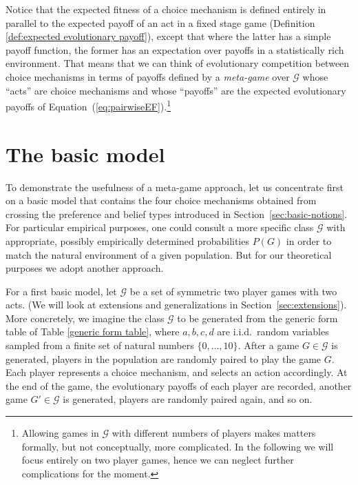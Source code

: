 \documentclass[fleqn,reqno,11pt]{article}
\begin{document}
Notice that the expected fitness of a choice mechanism is defined entirely in parallel to the
expected payoff of an act in a fixed stage game (Definition \ref{def:expected evolutionary payoff}), except that where the latter has a simple
payoff function, the former has an expectation over payoffs in a statistically rich
environment. That means that we can think of evolutionary competition between choice mechanisms
in terms of payoffs defined by a \emph{meta-game} over $\mathcal{G}$ whose ``acts'' are choice
mechanisms and whose ``payoffs'' are the expected evolutionary payoffs of
Equation~(\ref{eq:pairwiseEF}).\footnote{Allowing games in $\mathcal{G}$ with different numbers of players makes matters formally, but not conceptually, more complicated. In the following we will focus entirely on two player games, hence we can neglect further complications for the moment.}



\section{The basic model}
\label{sec:basic-model-1}

To demonstrate the usefulness of a meta-game approach, let us concentrate first on a basic
model that contains the four choice mechanisms obtained from crossing the preference and belief
types introduced in Section~\ref{sec:basic-notions}.  For particular empirical purposes, one
could consult a more specific class $\mathcal{G}$ with appropriate, possibly empirically
determined probabilities $P(G)$ in order to match the natural environment of a given
population. But for our theoretical purposes we adopt another approach. 

For a first basic
model, let $\mathcal{G}$ be a set of symmetric two player games with two acts. (We will look at
extensions and generalizations in Section~\ref{sec:extensions}). More concretely, we imagine the
class $\mathcal{G}$ to be generated from the generic form table of Table \ref{generic form
  table}, where $a,b,c,d$ are i.i.d.~random variables sampled from a finite set of natural
numbers $ \lbrace 0, \dots, 10 \rbrace$. After a game $G \in \mathcal{G}$ is generated, players in the population are randomly paired to play the game $G$. Each player represents a choice mechanism, and selects an action accordingly. At the end of the game, the evolutionary payoffs of each player are recorded, another game $G' \in \mathcal{G}$ is generated, players are randomly paired again, and so on. 
\end{document}

